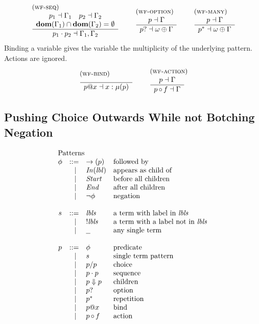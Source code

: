 \documentclass{article}
\makeatletter
\newcommand{\rulename}{\textsc}
\newcommand{\irule}[3]{\begin{array}{l}{~\small\mbox{(\rulename{#1})}}\\\;\frac{\begin{array}{c}#2\end{array}}{\begin{array}{l}#3\end{array}}\end{array}}
\newcommand{\lbl}{\ensuremath{\mathit{lbl}}}
\newcommand{\lbls}{\ensuremath{\mathit{lbls}}}
\newcommand{\pseq}[2]{\ensuremath{#1 \cdot #2}}
\newcommand{\por}[2]{\ensuremath{#1/#2}}
\newcommand{\children}[2]{\ensuremath{#1} \Downarrow #2}
\newcommand{\pnot}[1]{\ensuremath{\lnot #1}}
\newcommand{\maybe}[1]{\ensuremath{#1?}}
\newcommand{\many}[1]{\ensuremath{#1^*}}
\newcommand{\any}{\ensuremath{\text{\underline{\hspace{0.6em}}}}}
\newcommand{\bind}[2]{\ensuremath{#1@#2}}
\newcommand{\paction}[2]{\ensuremath{#1\mathop{\circ} #2}}
\newcommand{\fb}[1]{\ensuremath{\rightarrow(#1)}}
\newcommand{\pin}[1]{\ensuremath{\mathit{In}(#1)}}
\newcommand{\pstart}{\ensuremath{\mathit{Start}}}
\newcommand{\pend}{\ensuremath{\mathit{End}}}
\newcommand{\arrayheading}[2]{\multicolumn{#1}{l}{\mbox{#2}}}
\makeatother
\begin{document}
\[
  \begin{array}{c}
    \irule{wf-seq}{
    p_1 \dashv \Gamma_1\quad
    p_2 \dashv \Gamma_2\\
    \mathbf{dom}(\Gamma_1) \cap \mathbf{dom}(\Gamma_2) = \emptyset
    }{
    \pseq{p_1}{p_2} \dashv \Gamma_1, \Gamma_2
    }
    \quad
    \irule{wf-option}{
    p \dashv \Gamma
    }{
    \maybe{p} \dashv \omega \oplus \Gamma
    }
    \quad
    \irule{wf-many}{
    p \dashv \Gamma
    }{
    \many{p} \dashv \omega \oplus \Gamma
    }
  \end{array}
\]
%
Binding a variable gives the variable the multiplicity of the
underlying pattern. Actions are ignored.
\[
  \begin{array}{c}
    \irule{wf-bind}{
    }{
    \bind{p}{x} \dashv x : \mu(p)
    }
    \quad
    \irule{wf-action}{
    p \dashv \Gamma
    }{
    \paction{p}{f} \dashv \Gamma
    }
  \end{array}
\]

\subsection{Pushing Choice Outwards While not Botching Negation}

\[
  \begin{array}{crll}
    \arrayheading{4}{Patterns}\\
      \phi & ::= & \fb{p} & \text{followed by}\\
           & ~|~ & \pin{\lbl} & \text{appears as child of}\\
           & ~|~ & \pstart{} & \text{before all children}\\
           & ~|~ & \pend{} & \text{after all children}\\
           & ~|~ & \pnot{\phi} & \text{negation}\\
      \\
      s & ::= & \lbls & \text{a term with label in $\lbls$}\\
        & ~|~ & !\lbls & \text{a term with a label not in $\lbls$}\\
        & ~|~ & \any{} & \text{any single term}\\
      \\
      p & ::= & \phi & \text{predicate}\\
        & ~|~ & s & \text{single term pattern}\\
        & ~|~ & \por{p}{p} & \text{choice}\\
        & ~|~ & \pseq{p}{p} & \text{sequence}\\
        & ~|~ & \children{p}{p} & \text{children}\\
        & ~|~ & \maybe{p} & \text{option}\\
        & ~|~ & \many{p} & \text{repetition}\\
        & ~|~ & \bind{p}{x} & \text{bind}\\
        & ~|~ & \paction{p}{f} & \text{action}\\
  \end{array}
\]
\end{document}
